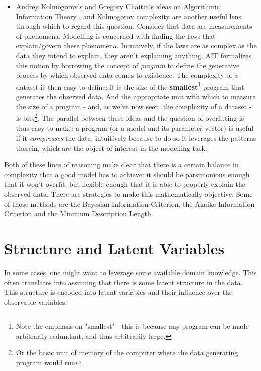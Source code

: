 \begin{itemize}
    \item Andrey Kolmogorov's and Gregory Chaitin's ideas on Algorithmic Information
        Theory \cite{chaitin-leibniz}, and Kolmogorov complexity  are another
        useful lens through which to regard this question. Consider that data are
        measurements of phenomena. Modelling is concerned with finding the
        laws that explain/govern these phenomena. Intuitively, if the laws are
        as complex as the data they intend to explain, they aren't explaining anything.
        AIT formalizes this notion by borrowing the concept of \emph{program} to
        define the generative process by which observed data comes to existence.
        The complexity of a dataset is then easy to define: it is the size of
        the \textbf{smallest}\footnote{Note the emphasis on "smallest" - this is
        because any program can be made arbitrarily redundant, and thus arbitrarily large.}
        program that generates the observed data. And the appropriate unit with
        which to measure the size of a program - and, as we've now seen, the
        complexity of a dataset - is bits\footnote{Or the basic unit of memory
        of the computer where the data generating program would run}. The parallel
        between these ideas and the question of overfitting is thus easy to make:
        a program (or a model and its parameter vector)  is useful if it 
        \emph{compresses} the data, intuitively because to do so it leverages the
        patterns therein, which are the object of interest in the modelling task.
\end{itemize}

Both of these lines of reasoning make clear that there is a certain balance
in complexity that a good model has to achieve: it should be parsimonious enough
that it won't overfit, but flexible enough that it is able to properly explain the observed
data.  There are strategies to make this mathematically objective. Some of those
methods are the Bayesian Information Criterion, the Akaike Information Criterion
and the Minimum Description Length.

\section{Structure and Latent Variables}
\label{section:probmodellatvar}
In some cases, one might want to leverage some available domain knowledge. This
often translates into assuming that there is some latent structure in the data.
This structure is encoded into latent variables and their influence over the
observable variables.


